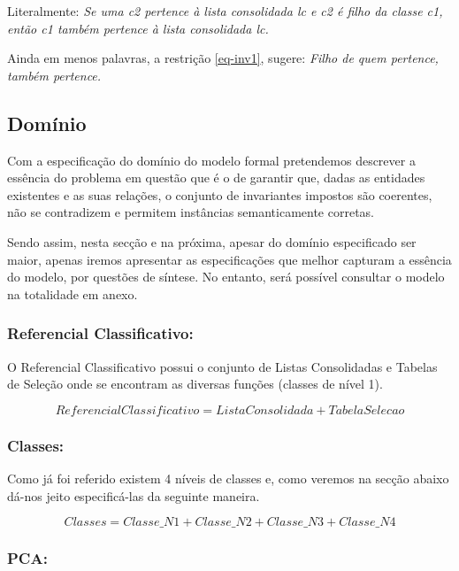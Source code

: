 \documentclass[tikz,runningheads,a4paper]{llncs}
\begin{document}
\noindent Literalmente:
\vskip0.2cm
\textit{Se uma c2 pertence à lista consolidada lc e c2 é filho da classe c1, então c1 também pertence à lista consolidada lc.}

\vskip0.2cm
\noindent Ainda em menos palavras, a restrição \eqref{eq-inv1}, sugere:
\vskip0.2cm
\textit{Filho de quem pertence, também pertence.}

\subsection{Domínio}

Com a especificação do domínio do modelo formal pretendemos descrever a essência do problema em questão que é o de garantir que, dadas as entidades existentes e as suas relações, o conjunto de invariantes impostos são coerentes, não se contradizem e permitem instâncias semanticamente corretas.

Sendo assim, nesta secção e na próxima, apesar do domínio especificado ser maior, apenas iremos apresentar as especificações que melhor capturam a essência do modelo, por questões de síntese. No entanto, será possível consultar o modelo na totalidade em anexo.

\subsubsection{Referencial Classificativo:}

O Referencial Classificativo possui o conjunto de Listas Consolidadas e Tabelas de Seleção onde se encontram as diversas funções (classes de nível 1).

\begin{equation*}
    ReferencialClassificativo = ListaConsolidada + TabelaSelecao
\end{equation*}

\subsubsection{Classes:}

Como já foi referido existem 4 níveis de classes e, como veremos na secção abaixo dá-nos jeito especificá-las da seguinte maneira.

\begin{equation*}
    Classes = Classe\_N1 + Classe\_N2 + Classe\_N3 + Classe\_N4
\end{equation*}

\subsubsection{PCA:}
\end{document}
